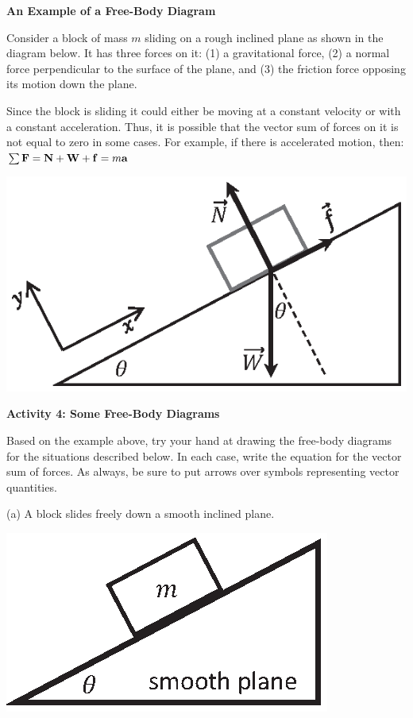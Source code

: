 \pagebreak[2]
\textbf{An Example of a Free-Body Diagram} 

Consider a block of mass $m$ sliding on a rough inclined plane as shown in the
diagram below. It has three forces on it: (1) a gravitational force, (2) a normal
force perpendicular to the surface of the plane, and (3) the friction force
opposing its motion down the plane.

Since the block is sliding it could either be moving at a constant velocity
or with a constant acceleration. Thus, it is possible that the vector sum of
forces on it is not equal to zero in some cases. For example, if there is accelerated
motion, then: \( \sum {\bf F} = {\bf N} + {\bf W} + {\bf f}
= m{\bf a}\)

{\par\centering \includegraphics{friction/force_diagram.eps} \par}

\bigskip
\textbf{Activity 4: Some Free-Body Diagrams} 

Based on the example above, try your hand at drawing the free-body diagrams for the
situations described below. In each case, write the equation for the vector
sum of forces. As always, be sure to put arrows over symbols representing vector
quantities.

(a) A block slides freely down a smooth inclined plane.

\vspace{0.3cm}
{\par\centering \includegraphics{friction/smooth_plane.eps} \par}

